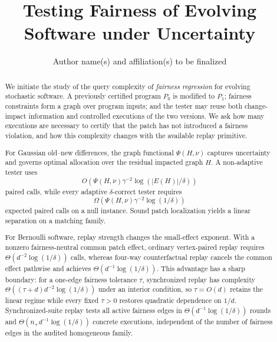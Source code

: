 \documentclass[11pt,letterpaper]{article}
\title{\textbf{Testing Fairness of Evolving Software under Uncertainty}}
\author{Author name(s) and affiliation(s) to be finalized}
\date{}
\begin{document}
\maketitle

\begin{abstract}
We initiate the study of the query complexity of \emph{fairness regression}
for evolving stochastic software.  A previously certified program $P_0$ is
modified to $P_1$; fairness constraints form a graph over program inputs; and
the tester may reuse both change-impact information and controlled executions of
the two versions.  We ask how many executions are necessary to certify that the
patch has not introduced a fairness violation, and how this complexity changes
with the available replay primitive.

For Gaussian old--new differences, the graph functional $\Psi(H,\nu)$ captures
uncertainty and governs optimal allocation over the residual impacted graph
$H$.  A non-adaptive tester uses
\[
O\!\left(\Psi(H,\nu)\gamma^{-2}\log(|E(H)|/\delta)\right)
\]
paired calls, while every adaptive $\delta$-correct tester requires
\[
\Omega\!\left(\Psi(H,\nu)\gamma^{-2}\log(1/\delta)\right)
\]
expected paired calls on a null instance.  Sound patch localization yields a
linear separation on a matching family.

For Bernoulli software, replay strength changes the small-effect exponent.
With a nonzero fairness-neutral common patch effect, ordinary vertex-paired
replay requires $\Theta(d^{-2}\log(1/\delta))$ calls, whereas four-way
counterfactual replay cancels the common effect pathwise and achieves
$\Theta(d^{-1}\log(1/\delta))$.  This advantage has a sharp boundary:
for a one-edge fairness tolerance $\tau$, synchronized replay has complexity
$\Theta((\tau+d)d^{-2}\log(1/\delta))$ under an interior condition, so
$\tau=O(d)$ retains the linear regime while every fixed $\tau>0$ restores
quadratic dependence on $1/d$.  Synchronized-suite replay tests all active
fairness edges in $\Theta(d^{-1}\log(1/\delta))$ rounds and
$\Theta(n_+d^{-1}\log(1/\delta))$ concrete executions, independent of the
number of fairness edges in the audited homogeneous family.


\end{abstract}
\end{document}
